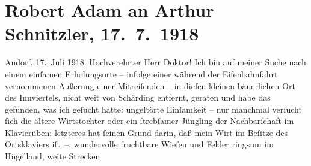 

         
         \renewcommand{\erwaehntePersonen}{Personen:  Charles I von England,  Hintermayer,  Hintermayer}
         \renewcommand{\erwaehnteOrte}{Orte: Andorf, Bayern, Innviertel, Schärding, Wien}
         \renewcommand{\erwaehnteWerke}{Werke: David Copperfield, Robert, Siebenkäs}
               \section[Robert Adam an Arthur Schnitzler, 17. 7. 1918]{ Robert Adam an Arthur Schnitzler, 17. 7. 1918}\nopagebreak{}\rehead{ }\begin{ledgroupsized}[t]{13cm}\normalsize\beginnumbering \toendnotes[C]{\smallbreak\pagebreak[2]} 
\toendnotes[C]{\smallbreak}\pstart
           \raggedleft{}{\pb}Andorf, 17. Juli
                  1918.\pend
           \pstart{}Hochverehrter Herr Doktor!\pend\pstart
           Ich bin auf meiner Suche nach einem einſamen Erholungsorte – infolge einer während
               der Eiſenbahnfahrt vernommenen Äußerung einer Mitreiſenden – in dieſen kleinen
               bäuerlichen Ort des Innviertels, nicht weit von
                  Schärding entfernt, geraten und habe das
               gefunden, was ich geſucht hatte: ungeſtörte Einſamkeit – nur manchmal verſucht ſich
               die ältere Wirtstochter oder
               ein ſtrebſamer Jüngling der Nachbarſchaft im Klavierüben; letzteres hat ſeinen Grund
               darin, daß mein Wirt im
               Beſitze des Ortsklaviers iſt –, wundervolle fruchtbare Wieſen und Felder ringsum im
               Hügelland, weite Strec{\pb}ken

\end{ledgroupsized}
